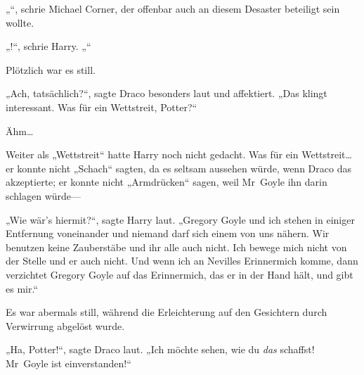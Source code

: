„“, schrie Michael Corner, der offenbar auch an diesem Desaster beteiligt sein wollte.

„!“, schrie Harry. „“

Plötzlich war es still.

„Ach, tatsächlich?“, sagte Draco besonders laut und affektiert. „Das klingt interessant. Was für ein Wettstreit, Potter?“

Ähm…

Weiter als „Wettstreit“ hatte Harry noch nicht gedacht. Was für ein Wettstreit…er konnte nicht „Schach“ sagten, da es seltsam aussehen würde, wenn Draco das akzeptierte; er konnte nicht „Armdrücken“ sagen, weil Mr~Goyle ihn darin schlagen würde—

„Wie wär’s hiermit?“, sagte Harry laut. „Gregory Goyle und ich stehen in einiger Entfernung voneinander und niemand darf sich einem von uns nähern. Wir benutzen keine Zauberstäbe und ihr alle auch nicht. Ich bewege mich nicht von der Stelle und er auch nicht. Und wenn ich an Nevilles Erinnermich komme, dann verzichtet Gregory Goyle auf das Erinnermich, das er in der Hand hält, und gibt es mir.“

Es war abermals still, während die Erleichterung auf den Gesichtern durch Verwirrung abgelöst wurde.

„Ha, Potter!“, sagte Draco laut. „Ich möchte sehen, wie du \emph{das} schaffst! Mr~Goyle ist einverstanden!“

